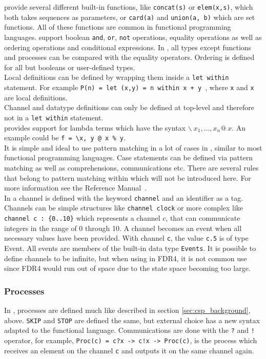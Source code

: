 \cspm{} provide several different built-in functions, like \texttt{concat(s)} or \texttt{elem(x,s)}, which both takes sequences as parameters, or \texttt{card(a)} and \texttt{union(a, b)} which are set functions. All of these functions are common in functional programming languages. \cspm{} support boolean \texttt{and}, \texttt{or}, \texttt{not} operations, equality operations as well as ordering operations and conditional expressions. In \cspm, all types except functions and processes can be compared with the equality operators. Ordering is defined for all but booleans or user-defined types. \\

Local definitions can be defined by wrapping them inside a \texttt{let within} statement. For example \texttt{P(n) = let (x,y) = n within x + y }, where \texttt{x} and \texttt{x} are local definitions.\\ Channel and datatype definitions can only be defined at top-level and therefore not in a \texttt{let within} statement. \\
\cspm{} provides support for lambda terms which have the syntax $\backslash \  x_1,...,x_n @\ x$. An example could be \texttt{f = \textbackslash x, y @ x \% y}. \\
It is simple and ideal to use pattern matching in a lot of cases in \cspm, similar to most functional programming languages. Case statements can be defined via pattern matching as well as comprehensions, communications etc. There are several rules that belong to pattern matching within \cspm{} which will not be introduced here. For more information see the \cspm{} Reference Manual~\cite{Scattergood2011}.\\

In \cspm{} a channel is defined with the keyword \texttt{channel} and an identifier as a tag. Channels can be simple structures like \texttt{channel clock} or more complex like \texttt{channel c : \{0..10\}} which represents a channel $c$, that can communicate integers in the range of 0 through 10. A channel becomes an event when all necessary values have been provided. With channel \texttt{c}, the value \texttt{c.5} is of type Event. All events are members of the built-in data type \texttt{Events}. It is possible to define channels to be infinite, but when using \cspm{} in FDR4, it is not common use since FDR4 would run out of space due to the state space becoming too large.

\subsubsection{\cspm{} Processes}
In \cspm{}, processes are defined much like described in section \ref{sec:csp_background}, above. \texttt{SKIP} and \texttt{STOP} are defined the same, but external choice has a new syntax adapted to the functional language. Communications are done with the \texttt{?} and \texttt{!} operator, for example, \texttt{Proc(c) = c?x -> c!x -> Proc(c)}, is the process which receives an element on the channel \texttt{c} and outputs it on the same channel again.

